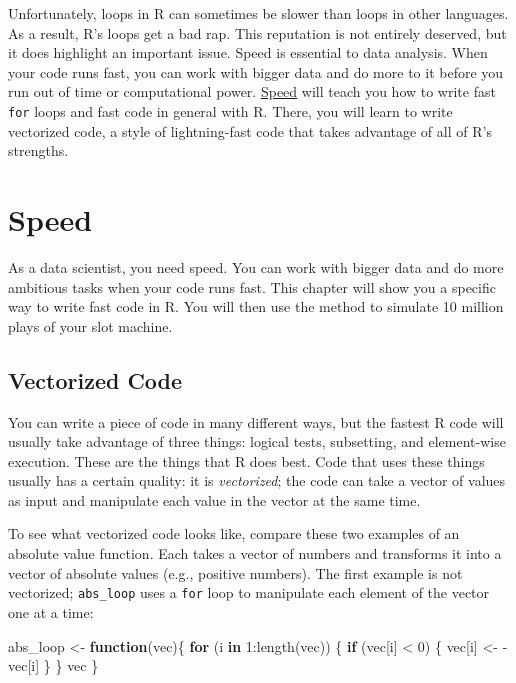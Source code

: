 \documentclass[
  letterpaper,
  DIV=11,
  numbers=noendperiod]{scrbook}
\newenvironment{Shaded}{\begin{snugshade}}{\end{snugshade}}
\newcommand{\ControlFlowTok}[1]{\textcolor[rgb]{0.00,0.23,0.31}{\textbf{#1}}}
\newcommand{\DecValTok}[1]{\textcolor[rgb]{0.68,0.00,0.00}{#1}}
\newcommand{\FunctionTok}[1]{\textcolor[rgb]{0.28,0.35,0.67}{#1}}
\newcommand{\NormalTok}[1]{\textcolor[rgb]{0.00,0.23,0.31}{#1}}
\newcommand{\OtherTok}[1]{\textcolor[rgb]{0.00,0.23,0.31}{#1}}
\newcommand{\SpecialCharTok}[1]{\textcolor[rgb]{0.37,0.37,0.37}{#1}}
\begin{document}
Unfortunately, loops in R can sometimes be slower than loops in other
languages. As a result, R's loops get a bad rap. This reputation is not
entirely deserved, but it does highlight an important issue. Speed is
essential to data analysis. When your code runs fast, you can work with
bigger data and do more to it before you run out of time or
computational power. \hyperref[sec-speed]{Speed} will teach you how to
write fast \texttt{for} loops and fast code in general with R. There,
you will learn to write vectorized code, a style of lightning-fast code
that takes advantage of all of R's strengths.

\chapter{Speed}\label{sec-speed}

As a data scientist, you need speed. You can work with bigger data and
do more ambitious tasks when your code runs fast. This chapter will show
you a specific way to write fast code in R. You will then use the method
to simulate 10 million plays of your slot machine.

\section{Vectorized Code}\label{vectorized-code}

You can write a piece of code in many different ways, but the fastest R
code will usually take advantage of three things: logical tests,
subsetting, and element-wise execution. These are the things that R does
best. Code that uses these things usually has a certain quality: it is
\emph{vectorized}; the code can take a vector of values as input and
manipulate each value in the vector at the same time.

To see what vectorized code looks like, compare these two examples of an
absolute value function. Each takes a vector of numbers and transforms
it into a vector of absolute values (e.g., positive numbers). The first
example is not vectorized; \texttt{abs\_loop} uses a \texttt{for} loop
to manipulate each element of the vector one at a time:

\begin{Shaded}
\begin{Highlighting}[]
\NormalTok{abs\_loop }\OtherTok{\textless{}{-}} \ControlFlowTok{function}\NormalTok{(vec)\{}
  \ControlFlowTok{for}\NormalTok{ (i }\ControlFlowTok{in} \DecValTok{1}\SpecialCharTok{:}\FunctionTok{length}\NormalTok{(vec)) \{}
    \ControlFlowTok{if}\NormalTok{ (vec[i] }\SpecialCharTok{\textless{}} \DecValTok{0}\NormalTok{) \{}
\NormalTok{      vec[i] }\OtherTok{\textless{}{-}} \SpecialCharTok{{-}}\NormalTok{vec[i]}
\NormalTok{    \}}
\NormalTok{  \}}
\NormalTok{  vec}
\NormalTok{\}}
\end{Highlighting}
\end{Shaded}
\end{document}
